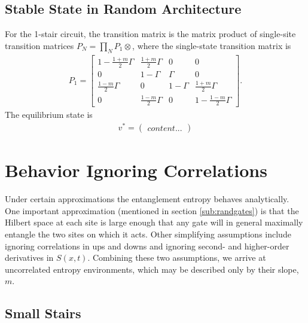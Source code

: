 \documentclass[11pt]{article}
\begin{document}
\subsection{Stable State in Random Architecture} \emph{} \label{subs:randstate}

For the 1-stair circuit, the transition matrix is the matrix product of single-site transition matrices $P_{N} = \prod_NP_{1}\otimes$, where the single-state transition matrix is
\begin{align}
P_1 = \begin{bmatrix}
1-\frac{1+m}{2}\Gamma & \frac{1+m}{2}\Gamma & 0 & 0\\
0 & 1-\Gamma & \Gamma & 0\\
\frac{1-m}{2}\Gamma & 0 & 1-\Gamma & \frac{1+m}{2}\Gamma\\
0 & \frac{1-m}{2}\Gamma & 0 & 1 - \frac{1-m}{2}\Gamma
\end{bmatrix}.
\end{align}
The equilibrium state is
\begin{align}
v^* = \begin{pmatrix}
content...
\end{pmatrix}
\end{align}

\section{Behavior Ignoring Correlations} \label{sec:anal}

Under certain approximations the entanglement entropy behaves analytically. One important approximation (mentioned in section \ref{sub:randgates}) is that the Hilbert space at each site is large enough that any gate will in general maximally entangle the two sites on which it acts. Other simplifying assumptions include ignoring correlations in ups and downs and ignoring second- and higher-order derivatives in $S(x,t)$. Combining these two assumptions, we arrive at uncorrelated entropy environments, which may be described only by their slope, $m$.

\subsection{Small Stairs} \label{sub:smallstairs} \emph{}
\end{document}
